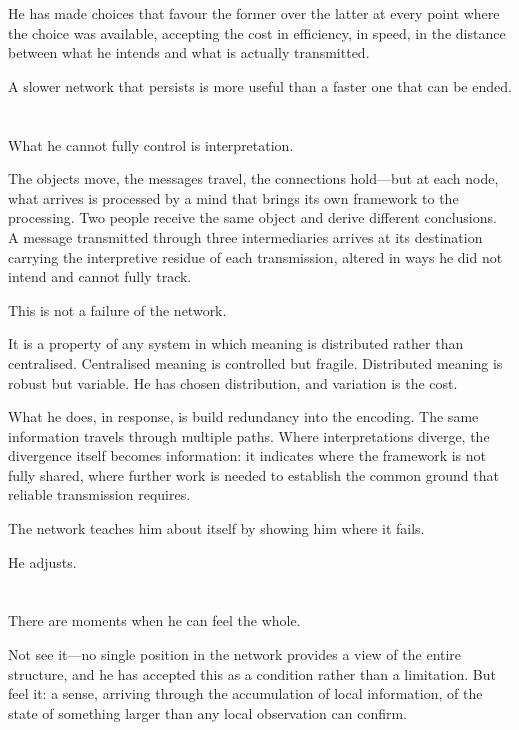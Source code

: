 He has made choices that favour the former over the latter
at every point where the choice was available, accepting
the cost in efficiency, in speed, in the distance between
what he intends and what is actually transmitted.

A slower network that persists is more useful than a faster
one that can be ended.

\section{}

What he cannot fully control is interpretation.

The objects move, the messages travel, the connections
hold---but at each node, what arrives is processed by a
mind that brings its own framework to the processing. Two
people receive the same object and derive different
conclusions. A message transmitted through three
intermediaries arrives at its destination carrying the
interpretive residue of each transmission, altered in
ways he did not intend and cannot fully track.

This is not a failure of the network.

It is a property of any system in which meaning is
distributed rather than centralised. Centralised meaning
is controlled but fragile. Distributed meaning is robust
but variable. He has chosen distribution, and variation
is the cost.

What he does, in response, is build redundancy into the
encoding. The same information travels through multiple
paths. Where interpretations diverge, the divergence
itself becomes information: it indicates where the
framework is not fully shared, where further work is
needed to establish the common ground that reliable
transmission requires.

The network teaches him about itself by showing him
where it fails.

He adjusts.

\section{}

There are moments when he can feel the whole.

Not see it---no single position in the network provides
a view of the entire structure, and he has accepted this
as a condition rather than a limitation. But feel it:
a sense, arriving through the accumulation of local
information, of the state of something larger than any
local observation can confirm.

